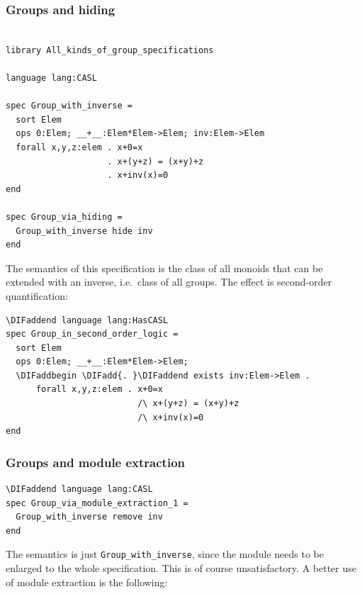 \documentclass[10pt,fleqn,final]{scrreprt}
\newcommand*{\syntax}[1]{\texttt{#1}}
\newcommand{\sssclause}[1]{\subsubsection{#1}}
\providecommand{\DIFadd}[1]{{\protect\color{blue}\uwave{#1}}} %
\providecommand{\DIFaddbegin}{} %
\providecommand{\DIFaddend}{} %
\providecommand{\DIFdelbegin}{} %
\providecommand{\DIFdelend}{} %
\begin{document}
\sssclause{Groups and hiding}
\DIFdelbegin %
\DIFdelend \DIFaddbegin \begin{lstlisting}[basicstyle=\ttfamily,language=dolText,alsolanguage=CASL,escapechar=@,mathescape]
\DIFaddend %prefix( lang: <http://purl.net/DOL/languages/> )%

library All_kinds_of_group_specifications

language lang:CASL

spec Group_with_inverse =
  sort Elem
  ops 0:Elem; __+__:Elem*Elem->Elem; inv:Elem->Elem
  forall x,y,z:elem . x+0=x
                    . x+(y+z) = (x+y)+z
                    . x+inv(x)=0
end

spec Group_via_hiding =
  Group_with_inverse hide inv
end
\end{lstlisting}

The semantics of this specification is the class of all monoids that
can be extended with an inverse, i.e.\ class of all groups. The effect
is second-order quantification:

\DIFdelbegin %
\DIFdelend \DIFaddbegin \begin{lstlisting}[basicstyle=\ttfamily,language=dolText,alsolanguage=CASL,escapechar=@,mathescape]
\DIFaddend language lang:HasCASL
spec Group_in_second_order_logic =
  sort Elem
  ops 0:Elem; __+__:Elem*Elem->Elem; 
  \DIFaddbegin \DIFadd{. }\DIFaddend exists inv:Elem->Elem .
      forall x,y,z:elem . x+0=x
                          /\ x+(y+z) = (x+y)+z
                          /\ x+inv(x)=0
end
\end{lstlisting}

\sssclause{Groups and module extraction}

\DIFdelbegin %
\DIFdelend \DIFaddbegin \begin{lstlisting}[basicstyle=\ttfamily,language=dolText,alsolanguage=CASL,escapechar=@,mathescape]
\DIFaddend language lang:CASL
spec Group_via_module_extraction_1 =
  Group_with_inverse remove inv
end
\end{lstlisting}
The semantics is just \syntax{Group\_with\_inverse},
since the module needs to be enlarged to the whole specification.
This is of course unsatisfactory. A better use of module extraction
is the following:
\end{document}
